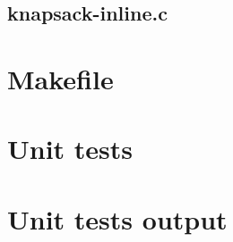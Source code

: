 \subsection{knapsack-inline.c}

\begin{scriptsize}
\begin{ttfamily}

\end{ttfamily}
\end{scriptsize}

\section{Makefile}

\begin{scriptsize}
\begin{ttfamily}

\end{ttfamily}
\end{scriptsize}

\section{Unit tests}

\begin{scriptsize}
\begin{ttfamily}

\end{ttfamily}
\end{scriptsize}

\section{Unit tests output}

\begin{scriptsize}
\begin{ttfamily}

\end{ttfamily}
\end{scriptsize}
